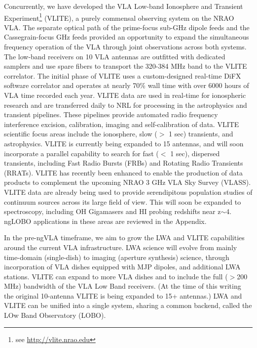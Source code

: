\documentclass[11pt]{article}
\begin{document}
Concurrently, we have developed the VLA Low-band Ionosphere and Transient Experiment\footnote[2]{\noindent see
\url{http://vlite.nrao.edu}} (VLITE), a purely commensal observing system on the NRAO VLA. The separate optical path of the prime-focus sub-GHz dipole feeds and the Cassegrain-focus GHz feeds provided an opportunity to expand the simultaneous frequency operation of the VLA through joint observations across both systems. The low-band receivers on 10 VLA antennas are outfitted with dedicated samplers and use spare fibers to transport the 320-384 MHz band to the VLITE correlator. The initial phase of VLITE uses a custom-designed real-time DiFX software correlator and operates at nearly 70\% wall time with over 6000 hours of VLA time recorded each year. VLITE data are used in real-time for ionospheric research and are transferred daily to NRL for processing in the astrophysics and transient pipelines. These pipelines provide automated radio frequency interference excision, calibration, imaging and self-calibration of data. VLITE scientific focus areas include the ionosphere, slow ($>$ 1 sec) transients, and astrophysics. VLITE is currently being expanded to 15 antennas, and will soon incorporate a parallel capability to search for fast ($<$ 1 sec), dispersed transients, including Fast Radio Bursts (FRBs) and Rotating Radio Transients (RRATs). VLITE has recently been enhanced to enable the production of data products to complement the upcoming NRAO 3 GHz VLA Sky Survey (VLASS).  VLITE data are already being used to provide serendipitous population studies of continuum sources across its large field of view. This will soon be expanded to spectroscopy, including OH Gigamasers and HI probing redshifts near z$\sim$4. ngLOBO applications in these areas are reviewed in the Appendix.

In the pre-ngVLA timeframe, we aim to grow the LWA and VLITE capabilities around the current VLA infrastructure. LWA science will evolve from mainly time-domain (single-dish) to imaging (aperture synthesis) science, through incorporation of VLA dishes equipped with MJP dipoles, and additional LWA stations. VLITE can expand to more VLA dishes and to include the full ($>$200 MHz) bandwidth of the VLA Low Band receivers. (At the time of this writing the original 10-antenna VLITE is being expanded to 15+ antennas.) LWA and VLITE can be unified into a single system, sharing a common backend, called the LOw Band Observatory (LOBO). 
\end{document}
